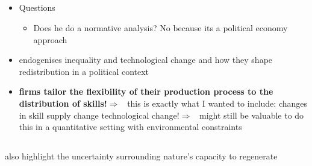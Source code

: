 \documentclass[12pt]{article}
\newcommand{\ar}{$\Rightarrow$ \ }
\begin{document}
\subsection{\cite{Benabou2005InequalityContract}}
\begin{itemize}
	\item Questions
	\begin{itemize}
	\item Does he do a normative analysis? No because its a political economy approach
	\end{itemize}
	\item endogenises inequality and technological change and how they shape redistribution in a political context
	\item \textbf{firms tailor the flexibility of their production process to the distribution of skills!}\ar this is exactly what I wanted to include: changes in skill supply change technological change!\ar might still be valuable to do this in a quantitative setting with environmental constraints
	
\end{itemize}
\subsection{\cite{Acemoglu2012TheChange}} also highlight the uncertainty surrounding nature's capacity to regenerate
\subsection{\cite{Acemoglu2002DirectedChange}}
\end{document}
